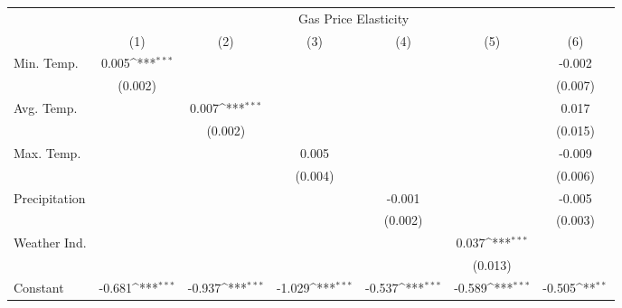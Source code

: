{
\def\sym#1{\ifmmode^{#1}\else\(^{#1}\)\fi}
\begin{tabular}{l*{6}{c}}
\hline\hline
            &\multicolumn{6}{c}{Gas Price Elasticity}                                                                                           \\
            &\multicolumn{1}{c}{(1)}         &\multicolumn{1}{c}{(2)}         &\multicolumn{1}{c}{(3)}         &\multicolumn{1}{c}{(4)}         &\multicolumn{1}{c}{(5)}         &\multicolumn{1}{c}{(6)}         \\
\hline
Min. Temp.  &       0.005\sym{***}&                     &                     &                     &                     &      -0.002         \\
            &     (0.002)         &                     &                     &                     &                     &     (0.007)         \\
[1em]
Avg. Temp.  &                     &       0.007\sym{***}&                     &                     &                     &       0.017         \\
            &                     &     (0.002)         &                     &                     &                     &     (0.015)         \\
[1em]
Max. Temp.  &                     &                     &       0.005         &                     &                     &      -0.009         \\
            &                     &                     &     (0.004)         &                     &                     &     (0.006)         \\
[1em]
Precipitation&                     &                     &                     &      -0.001         &                     &      -0.005         \\
            &                     &                     &                     &     (0.002)         &                     &     (0.003)         \\
[1em]
Weather Ind.&                     &                     &                     &                     &       0.037\sym{***}&                     \\
            &                     &                     &                     &                     &     (0.013)         &                     \\
[1em]
Constant    &      -0.681\sym{***}&      -0.937\sym{***}&      -1.029\sym{***}&      -0.537\sym{***}&      -0.589\sym{***}&      -0.505\sym{**} \\

\end{tabular}}
